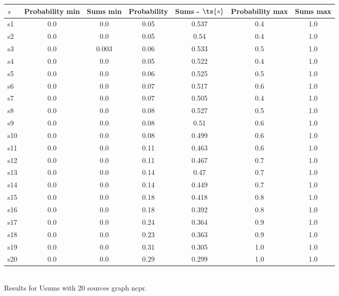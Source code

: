 \documentclass{article}
\begin{document}
\noindent\begin{tabular}{|l|c|c|c|c|c|c|}
\hline
$s$& Probability min & Sums min & Probability & Sums - $\ts{s}$ & Probability max & Sums max\\
\hline
s1 &0.0 & 0.0 & 0.05 & 0.537 & 0.4 & 1.0\\
\hline
s2 &0.0 & 0.0 & 0.05 & 0.54 & 0.4 & 1.0\\
\hline
s3 &0.0 & 0.003 & 0.06 & 0.533 & 0.5 & 1.0\\
\hline
s4 &0.0 & 0.0 & 0.05 & 0.522 & 0.4 & 1.0\\
\hline
s5 &0.0 & 0.0 & 0.06 & 0.525 & 0.5 & 1.0\\
\hline
s6 &0.0 & 0.0 & 0.07 & 0.517 & 0.6 & 1.0\\
\hline
s7 &0.0 & 0.0 & 0.07 & 0.505 & 0.4 & 1.0\\
\hline
s8 &0.0 & 0.0 & 0.08 & 0.527 & 0.5 & 1.0\\
\hline
s9 &0.0 & 0.0 & 0.08 & 0.51 & 0.6 & 1.0\\
\hline
s10 &0.0 & 0.0 & 0.08 & 0.499 & 0.6 & 1.0\\
\hline
s11 &0.0 & 0.0 & 0.11 & 0.463 & 0.6 & 1.0\\
\hline
s12 &0.0 & 0.0 & 0.11 & 0.467 & 0.7 & 1.0\\
\hline
s13 &0.0 & 0.0 & 0.14 & 0.47 & 0.7 & 1.0\\
\hline
s14 &0.0 & 0.0 & 0.14 & 0.449 & 0.7 & 1.0\\
\hline
s15 &0.0 & 0.0 & 0.18 & 0.418 & 0.8 & 1.0\\
\hline
s16 &0.0 & 0.0 & 0.18 & 0.392 & 0.8 & 1.0\\
\hline
s17 &0.0 & 0.0 & 0.24 & 0.364 & 0.9 & 1.0\\
\hline
s18 &0.0 & 0.0 & 0.23 & 0.363 & 0.9 & 1.0\\
\hline
s19 &0.0 & 0.0 & 0.31 & 0.305 & 1.0 & 1.0\\
\hline
s20 &0.0 & 0.0 & 0.29 & 0.299 & 1.0 & 1.0\\
\hline
\end{tabular}\\

\noindent Results for Usums with 20 sources graph ncpr.
\end{document}
